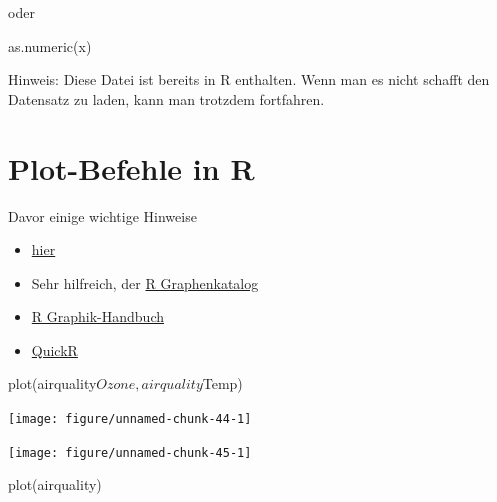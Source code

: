 \documentclass[a4paper,twoside]{tufte-book}\usepackage[]{graphicx}\usepackage[]{color}
\begin{document}
\begin{appendices}
oder

\begin{Schunk}
\begin{Sinput}
as.numeric(x)
\end{Sinput}
\end{Schunk}

Hinweis: Diese Datei ist bereits in R enthalten. Wenn man es nicht schafft den Datensatz zu laden, kann man trotzdem fortfahren.

\chapter{Plot-Befehle in R}

Davor einige wichtige Hinweise

\begin{itemize}
\item \href{http://rgraphgallery.blogspot.de/search/label/3%20vartiable%20plots}{hier}
\item Sehr hilfreich, der \href{http://shiny.stat.ubc.ca/r-graph-catalog/#}{R Graphenkatalog}
\item \href{http://rgm3.lab.nig.ac.jp/RGM/R_image_list?page=2282&init=true}{R Graphik-Handbuch}
\item \href{http://www.statmethods.net/graphs/line.html}{QuickR}
\end{itemize}



\begin{Schunk}
\begin{Sinput}
plot(airquality$Ozone, airquality$Temp)
\end{Sinput}


{\centering \texttt{[image: figure/unnamed-chunk-44-1]} 

}

\end{Schunk}


\begin{Schunk}


{\centering \texttt{[image: figure/unnamed-chunk-45-1]} 

}

\end{Schunk}


\begin{Schunk}
\begin{Sinput}
plot(airquality)
\end{Sinput}



\end{Schunk}
\end{appendices}
\end{document}
